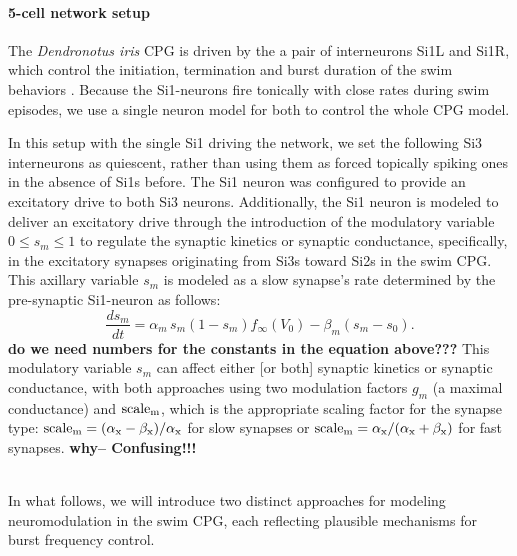 \documentclass[nofootinbib,aip,amsmath,amssymb,reprint,twocolumn,10pt]{revtex4-2}
\begin{document}
\paragraph{5-cell network setup}

The {\em Dendronotus iris} CPG is driven by the a pair of interneurons Si1L and Si1R, which control the initiation, termination and burst duration of the swim behaviors \cite{sakurai2019command, SakuraiKatz2016}. Because the Si1-neurons fire tonically with close rates during swim episodes, we use a single neuron model for both to control the whole CPG model.

In this setup with the single Si1 driving the network, we set the following Si3 interneurons as quiescent, rather than using them as forced topically spiking ones in the absence of Si1s before. The Si1 neuron was configured to provide an excitatory drive to both Si3 neurons. Additionally, the Si1 neuron is modeled to deliver an excitatory drive through  the introduction of the modulatory variable $0 \le s_m \le 1$ to regulate the synaptic kinetics or synaptic conductance, specifically, in the excitatory synapses originating from Si3s toward Si2s in the swim CPG. This axillary variable $s_m$ is modeled as a slow synapse's rate determined by the pre-synaptic Si1-neuron as follows:
%
\begin{equation}
\frac{ds_m}{dt} = \alpha_m\, s_m (1 - s_m) f_{\infty}(V_0) - \beta_m (s_m - s_0).
\end{equation}
{\bf do we need numbers for the constants in the equation above???}
%
This modulatory variable  $s_m$ can affect either [or both] synaptic kinetics or synaptic conductance, with both approaches using two modulation factors $g_m$ (a maximal conductance) and $\rm scale_m$, which is the appropriate scaling factor for the synapse type: $\rm scale_m = (\alpha_x - \beta_x)/\alpha_x$ for slow synapses or $\rm scale_m = \alpha_x/(\alpha_x + \beta_x)$ for fast synapses. {\bf why--  Confusing!!! }

~\\
In what follows, we will introduce two distinct approaches for modeling neuromodulation in the swim CPG, each reflecting plausible mechanisms for burst frequency control.
\end{document}
